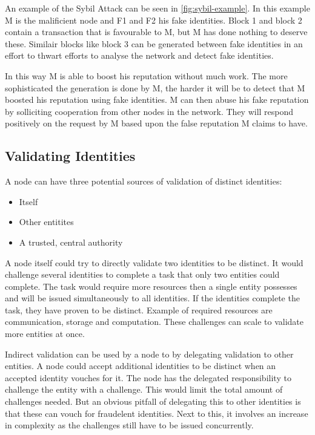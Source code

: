 An example of the Sybil Attack can be seen in \ref{fig:sybil-example}.
In this example M is the malificient node and F1 and F2 his fake identities.
Block 1 and block 2 contain a transaction that is favourable to M,
but M has done nothing to deserve these.
Similair blocks like block 3 can be generated between fake identities in an effort to thwart efforts to analyse the network
and detect fake identities.

In this way M is able to boost his reputation without much work.
The more sophisticated the generation is done by M,
the harder it will be to detect that M boosted his reputation using fake identities.
M can then abuse his fake reputation by solliciting cooperation from other nodes in the network.
They will respond positively on the request by M based upon the false reputation M claims to have.

\subsection{Validating Identities}
A node can have three potential sources of validation of distinct identities:
\begin{itemize}
\item Itself
\item Other entitites
\item A trusted, central authority
\end{itemize}

A node itself could try to directly validate two identities to be distinct.
It would challenge several identities to complete a task that only two entities could complete.
The task would require more resources then a single entity possesses and will be issued simultaneously to all identities.
If the identities complete the task, they have proven to be distinct.
Example of required resources are communication, storage and computation.
These challenges can scale to validate more entities at once.

Indirect validation can be used by a node to by delegating validation to other entities.
A node could accept additional identities to be distinct when an accepted identity vouches for it.
The node has the delegated responsibility to challenge the entity with a challenge.
This would limit the total amount of challenges needed.
But an obvious pitfall of delegating this to other identities is that these can vouch for fraudelent identities.
Next to this, it involves an increase in complexity as the challenges still have to be issued concurrently.

